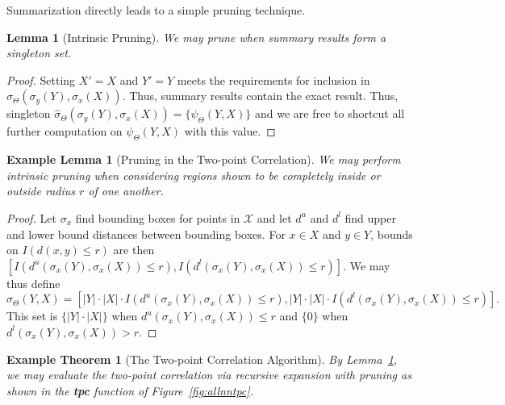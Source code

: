 \documentclass{article}
\newtheorem{lemma}{Lemma}
\newtheorem{examplelemma} {Example Lemma}
\newtheorem{exampletheorem} {Example Theorem}
\newcommand{\maybekillspace}{\vspace{-0.08in}}
\newcommand{\killspace}{\vspace{-0.08in}}
\newcommand{\GNP}[1][\psi]{{#1}_{\Theta}}
\newcommand{\sigmahat}{\mathbin{\widehat{\sigma}}}
\newcommand{\disthrectmin}{d^{l}}
\newcommand{\disthrectmax}{d^{u}}
\begin{document}
Summarization directly leads to a simple pruning technique.
\begin{lemma}[Intrinsic Pruning]
  We may prune when summary results form a singleton set.
\end{lemma}
\killspace
\begin{proof}
  Setting $X' = X$ and $Y' = Y$ meets the requirements for inclusion in $\GNP[\sigmahat](\sigma_y(Y),\sigma_x(X))$.
  Thus, summary results contain the exact result.
  Thus, singleton $\GNP[\sigmahat](\sigma_y(Y),\sigma_x(X)) = \{\GNP(Y,X)\}$ and we are free to shortcut all further computation on $\GNP(Y,X)$ with this value.
\end{proof}
\killspace
\begin{examplelemma}[Pruning in the Two-point Correlation]\label{lem:2pt}
  We may perform intrinsic pruning when considering regions shown to
  be completely inside or outside radius $r$ of one another.
\end{examplelemma}
\killspace
\begin{proof}
  Let $\sigma_x$ find bounding boxes for points in $\mathcal{X}$ and
  let $\disthrectmax$ and $\disthrectmin$ find upper and lower bound distances between bounding boxes.
  For $x \in X$ and $y \in Y$, bounds on $I(d(x,y) \leq r)$ are then $\left[
  I(\disthrectmax(\sigma_x(Y),\sigma_x(X)) \leq r),
  I(\disthrectmin(\sigma_x(Y),\sigma_x(X)) \leq r) \right]$.
  We may thus define
  \[
  \GNP[\sigmahat](Y,X) = \left[ |Y| \cdot |X| \cdot I(\disthrectmax(\sigma_x(Y),\sigma_x(X)) \leq r), |Y| \cdot |X| \cdot I(\disthrectmin(\sigma_x(Y),\sigma_x(X)) \leq r) \right].
  \]
  This set is $\{|Y| \cdot |X|\}$ when
  $\disthrectmax(\sigma_x(Y),\sigma_x(X)) \leq r$ and $\{0\}$ when
  $\disthrectmin(\sigma_x(Y),\sigma_x(X)) > r$.
\end{proof}
\killspace
\begin{exampletheorem}[The Two-point Correlation Algorithm]
  By Lemma~\ref{lem:2pt}, we may evaluate the two-point correlation
  via recursive expansion with pruning as shown in the {\bf tpc}
  function of Figure~\ref{fig:allnntpc}.
\end{exampletheorem}
\maybekillspace

\end{document}
